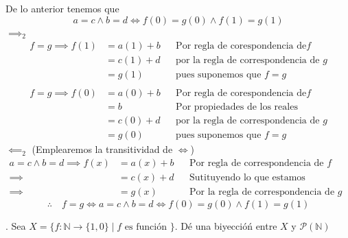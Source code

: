 \documentclass[letterpaper]{article}
\newcommand{\N}{\mathds{N}}
\renewcommand{\P}{\mathcal{P}}
\renewcommand{\*}{\cdot}
\theoremstyle{definition}
\begin{document}
De lo anterior tenemos que 
\[ a = c \land b = d \iff f(0) = g(0) \land f(1) = g(1) \]
$ \implies_2 $
\begin{align*}
	f = g \implies f (1) &= a(1) + b &&\text{Por regla de corespondencia de} f \\
	 &= c(1) + d &&\text{por la regla de correspondencia de }g \\
	 &= g(1) &&\text{pues suponemos que } f = g \\ \\
	f = g \implies f (0) &= a(0) + b &&\text{Por regla de corespondencia de} f \\
	 &= b &&\text{Por propiedades de los reales} \\
	 &= c (0) + d &&\text{por la regla de correspondencia de }g \\
	 &= g(0) &&\text{pues suponemos que } f = g 
\end{align*}
$ \impliedby_2 $ (Emplearemos la transitividad de $ \iff $)
\begin{align*}
	a = c \land b = d \implies f(x) &= a(x) + b &&\text{Por regla de correspondencia de } f\\
	\implies &= c(x) + d &&\text{Sutituyendo lo que estamos suponiendo }\\
	\implies &= g(x) &&\text{Por la regla de correspondencia de } g
\end{align*}
$$ \therefore \quad f = g \iff a = c \land b = d \iff f(0) = g(0) \land f(1) = g(1)  $$


. Sea $ X = \{ f: \N \to \{1,0\} \mid f \text{ es función } \}  $. Dé una biyeccióń entre $ X $ y $ \P(\N) $\\
\end{document}
